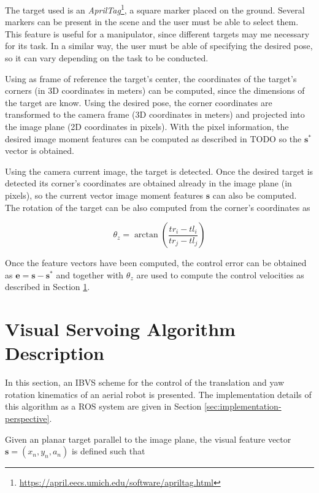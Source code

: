 The target used is an \emph{AprilTag}\footnote{\url{https://april.eecs.umich.edu/software/apriltag.html}}, a square marker placed on the ground. Several markers can be present in the scene and the user must be able to select them. This feature is useful for a manipulator, since different targets may me necessary for its task. In a similar way, the user must be able of specifying the desired pose, so it can vary depending on the task to be conducted.

Using as frame of reference the target's center, the coordinates of the target's corners (in 3D coordinates in meters) can be computed, since the dimensions of the target are know. Using the desired pose, the corner coordinates are transformed to the camera frame (3D coordinates in meters) and projected into the image plane (2D coordinates in pixels). With the pixel information, the desired image moment features can be computed as described in TODO so the $\bm{s}^\ast$ vector is obtained.
 
Using the camera current image, the target is detected. Once the desired target is detected its corner's coordinates are obtained already in the image plane (in pixels), so the current vector image moment features $\bm{s}$ can also be computed. The rotation of the target can be also computed from the corner's coordinates as

\begin{equation}
 \theta_z = \arctan \left( \frac{tr_i - tl_i}{tr_j - tl_j} \right) 
\end{equation}
 
 Once the feature vectors have been computed, the control error can be obtained as $\bm{e} = \bm{s} - \bm{s}^\ast$ and together with $\theta_z$ are used to compute the control velocities as described in Section \ref{sec:vs-algorithm-description}.
	


\section{Visual Servoing Algorithm Description}
\label{sec:vs-algorithm-description}

In this section, an IBVS scheme for the control of the translation and yaw rotation kinematics \cite{bourquardez_2009} of an aerial robot is presented. The implementation details of this algorithm as a ROS system are given in Section \ref{sec:implementation-perspective}. 

Given an planar target parallel to the image plane, the visual feature vector $\bm{s} = (x_n, y_n, a_n)$ is defined such that

